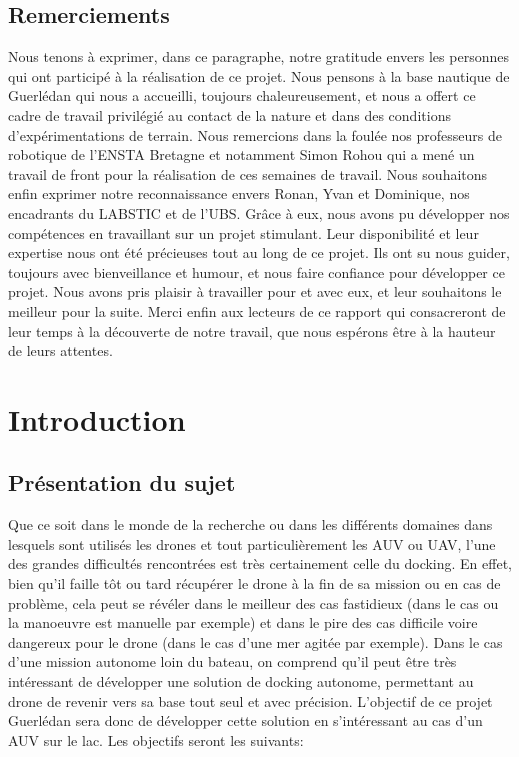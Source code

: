 \documentclass[12pt]{report}
\begin{document}


\tableofcontents

\newpage
\section*{\centering Remerciements}
Nous tenons à exprimer, dans ce paragraphe, notre gratitude envers les personnes qui ont participé à la réalisation de ce projet. 
Nous pensons à la base nautique de Guerlédan qui nous a accueilli, toujours chaleureusement, et nous a offert ce cadre de travail privilégié au contact de la nature et dans des conditions d'expérimentations de terrain.
Nous remercions dans la foulée nos professeurs de robotique de l'ENSTA Bretagne et notamment Simon Rohou qui a mené un travail de front pour la réalisation de ces semaines de travail.
Nous souhaitons enfin exprimer notre reconnaissance envers Ronan, Yvan et Dominique, nos encadrants du LABSTIC et de l'UBS. Grâce à eux, nous avons pu développer nos compétences en travaillant sur 
un projet stimulant. Leur disponibilité et leur expertise nous ont été précieuses tout au long de ce projet. Ils ont su nous guider, toujours avec bienveillance et humour, et nous faire confiance pour développer ce projet.
Nous avons pris plaisir à travailler pour et avec eux, et leur souhaitons le meilleur pour la suite. Merci enfin aux lecteurs de ce rapport qui consacreront de leur temps à la découverte de notre travail, que nous espérons être à la hauteur de leurs attentes.

\chapter{Introduction}

\section{Présentation du sujet}

Que ce soit dans le monde de la recherche ou dans les différents domaines dans lesquels sont utilisés les drones et tout particulièrement les AUV ou UAV, l'une des grandes difficultés rencontrées est très certainement celle du docking. En effet, bien qu'il faille tôt ou tard récupérer le drone à la fin de sa mission ou en cas de problème, cela peut se révéler dans le meilleur des cas fastidieux (dans le cas ou la manoeuvre est manuelle par exemple) et dans le pire des cas difficile voire dangereux pour le drone (dans le cas d'une mer agitée par exemple). Dans le cas d'une mission autonome loin du bateau, on comprend qu'il peut être très intéressant de développer une solution de docking autonome, permettant au drone de revenir vers sa base tout seul et avec précision. L'objectif de ce projet Guerlédan sera donc de développer cette solution en s'intéressant au cas d'un AUV sur le lac. Les objectifs seront les suivants:
\end{document}
